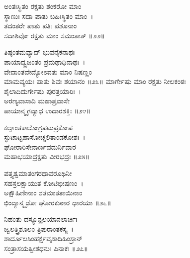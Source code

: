 ಅಂತಃಸ್ಥಿತಂ ರಕ್ಷತು ಶಂಕರೋ ಮಾಂ\\ಸ್ಥಾಣುಃ ಸದಾ ಪಾತು ಬಹಿಃಸ್ಥಿತಂ ಮಾಂ~।\\
ತದಂತರೇ ಪಾತು ಪತಿಃ ಪಶೂನಾಂ\\ಸದಾಶಿವೋ ರಕ್ಷತು ಮಾಂ ಸಮಂತಾತ್ ॥೨೨॥

ತಿಷ್ಠಂತಮವ್ಯಾದ್ ಭುವನೈಕನಾಥಃ\\ಪಾಯಾದ್ವ್ರಜಂತಂ ಪ್ರಮಥಾಧಿನಾಥಃ~।\\
ವೇದಾಂತವೇದ್ಯೋಽವತು ಮಾಂ ನಿಷಣ್ಣಂ\\ ಮಾಮವ್ಯಯಃ ಪಾತು ಶಿವಃ ಶಯಾನಂ ॥೨೩॥
\newpage
ಮಾರ್ಗೇಷು ಮಾಂ ರಕ್ಷತು ನೀಲಕಂಠಃ\\ಶೈಲಾದಿದುರ್ಗೇಷು ಪುರತ್ರಯಾರಿಃ~।\\
ಅರಣ್ಯವಾಸಾದಿ ಮಹಾಪ್ರವಾಸೇ\\ಪಾಯಾನ್ಮೃಗವ್ಯಾಧ ಉದಾರಶಕ್ತಿಃ ॥೨೪॥

ಕಲ್ಪಾಂತಕಾಲೋಗ್ರಪಟುಪ್ರಕೋಪ\\ಸ್ಫುಟಾಟ್ಟಹಾಸೋಚ್ಚಲಿತಾಂಡಕೋಶಃ~।\\
ಘೋರಾರಿಸೇನಾರ್ಣವದುರ್ನಿವಾರ\\ಮಹಾಭಯಾದ್ರಕ್ಷತು ವೀರಭದ್ರಃ ॥೨೫॥

ಪತ್ತ್ಯಶ್ವಮಾತಂಗರಥಾವರೂಥಿನೀ\\ಸಹಸ್ರಲಕ್ಷಾಯುತ ಕೋಟಿಭೀಷಣಂ~।\\
ಅಕ್ಷೌಹಿಣೀನಾಂ ಶತಮಾತತಾಯಿನಾಂ\\ಛಿಂದ್ಯಾನ್ಮೃಡೋ ಘೋರಕುಠಾರ ಧಾರಯಾ ॥೨೬॥

ನಿಹಂತು ದಸ್ಯೂನ್ಪ್ರಲಯಾನಲಾರ್ಚಿಃ\\ಜ್ವಲತ್ತ್ರಿಶೂಲಂ ತ್ರಿಪುರಾಂತಕಸ್ಯ~।\\
ಶಾರ್ದೂಲಸಿಂಹರ್ಕ್ಷವೃಕಾದಿಹಿಂಸ್ರಾನ್\\ಸಂತ್ರಾಸಯತ್ವೀಶಧನುಃ ಪಿನಾಕಃ ॥೨೭॥

